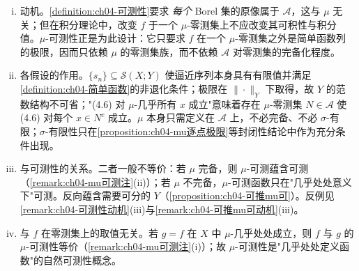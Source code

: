 \documentclass[../../main.tex]{subfiles}%
\begin{document}
\begin{remark}\label{remark:ch04-mu可测动机}
\begin{enumerate}[(i)]
\item 动机。\cref{definition:ch04-可测性}要求 \emph{每个} Borel 集的原像属于 $\mathcal{A}$，这与 $\mu$ 无关；但在积分理论中，改变 $f$ 于一个 $\mu$-零测集上不应改变其可积性与积分值。$\mu$-可测性正是为此设计：它只要求 $f$ 在一个 $\mu$-零测集之外是简单函数列的极限，因而只依赖 $\mu$ 的零测集族，而不依赖 $\mathcal{A}$ 对零测集的完备化程度。
\item 各假设的作用。$\{s_n\}\subseteq\mathcal{S}(X;Y)$ 使逼近序列本身具有有限值并满足\cref{definition:ch04-简单函数}的非退化条件；极限在 $\|\cdot\|_Y$ 下取得，故 $Y$ 的范数结构不可省；"(4.6) 对 $\mu$-几乎所有 $x$ 成立"意味着存在 $\mu$-零测集 $N\in\mathcal{A}$ 使 (4.6) 对每个 $x\in N^c$ 成立。$\mu$ 本身只需定义在 $\mathcal{A}$ 上，不必完备、不必 $\sigma$-有限；$\sigma$-有限性只在\cref{proposition:ch04-mu逐点极限}等封闭性结论中作为充分条件出现。
\item 与可测性的关系。二者一般不等价：若 $\mu$ 完备，则 $\mu$-可测蕴含可测（\cref{remark:ch04-mu可测注}(ii)）；若 $\mu$ 不完备，$\mu$-可测函数只在"几乎处处意义下"可测。反向蕴含需要可分的 $Y$（\cref{proposition:ch04-可推mu可}）。反例见\cref{remark:ch04-可测性动机}(iii)与\cref{remark:ch04-可推mu可动机}(iii)。
\item 与 $f$ 在零测集上的取值无关。若 $g=f$ 在 $X$ 中 $\mu$-几乎处处成立，则 $f$ 与 $g$ 的 $\mu$-可测性等价（\cref{remark:ch04-mu可测注}(i)）；故 $\mu$-可测性是"几乎处处定义函数"的自然可测性概念。
\end{enumerate}
\end{remark}
\end{document}
